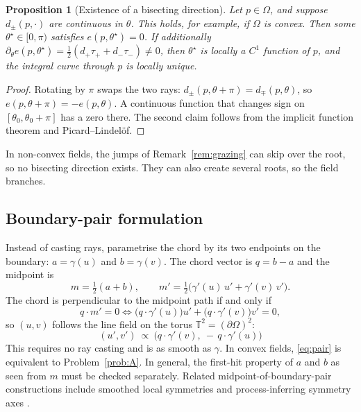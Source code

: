 \documentclass[11pt,a4paper]{article}
\numberwithin{equation}{section}
\theoremstyle{plain}
\newtheorem{proposition}{Proposition}[section]
\theoremstyle{definition}
\theoremstyle{remark}
\newcommand{\pO}{\partial\Omega}
\begin{document}
\begin{proposition}[Existence of a bisecting direction]\label{prop:existence}
Let $p\in\Omega$, and suppose $d_\pm(p,\cdot)$ are continuous in $\theta$. This holds, for example, if $\Omega$ is convex. Then some $\theta^\star\in[0,\pi)$ satisfies $e(p,\theta^\star)=0$. If additionally $\partial_\theta e(p,\theta^\star) = \tfrac12(d_+\tau_++d_-\tau_-)\neq0$, then $\theta^\star$ is locally a $C^1$ function of $p$, and the integral curve through $p$ is locally unique.
\end{proposition}
\begin{proof}
Rotating by $\pi$ swaps the two rays: $d_\pm(p,\theta+\pi)=d_\mp(p,\theta)$, so $e(p,\theta+\pi)=-e(p,\theta)$. A continuous function that changes sign on $[\theta_0,\theta_0+\pi]$ has a zero there. The second claim follows from the implicit function theorem and Picard--Lindel\"of.
\end{proof}

In non-convex fields, the jumps of Remark~\ref{rem:grazing} can skip over the root, so no bisecting direction exists. They can also create several roots, so the field branches.

\subsection{Boundary-pair formulation}
\label{sec:pair}

Instead of casting rays, parametrise the chord by its two endpoints on the boundary: $a=\gamma(u)$ and $b=\gamma(v)$. The chord vector is $q=b-a$ and the midpoint is
\begin{equation}
m=\tfrac12(a+b), \qquad m'=\tfrac12\bigl(\gamma'(u)\,u'+\gamma'(v)\,v'\bigr).
\label{eq:midpoint}
\end{equation}
The chord is perpendicular to the midpoint path if and only if
\begin{equation}
q\cdot m' = 0 \iff \bigl(q\cdot\gamma'(u)\bigr)u'+\bigl(q\cdot\gamma'(v)\bigr)v'=0,
\label{eq:perp}
\end{equation}
so $(u,v)$ follows the line field on the torus $\mathbb T^2=(\pO)^2$:
\begin{equation}
\boxed{\;(u',v')\ \propto\ \bigl(q\cdot\gamma'(v),\ -\,q\cdot\gamma'(u)\bigr)\;}
\label{eq:pair}
\end{equation}
This requires no ray casting and is as smooth as $\gamma$. In convex fields, \eqref{eq:pair} is equivalent to Problem~\ref{prob:A}. In general, the first-hit property of $a$ and $b$ as seen from $m$ must be checked separately. Related midpoint-of-boundary-pair constructions include smoothed local symmetries \citep{brady1984} and process-inferring symmetry axes \citep{leyton1987}.
\end{document}
